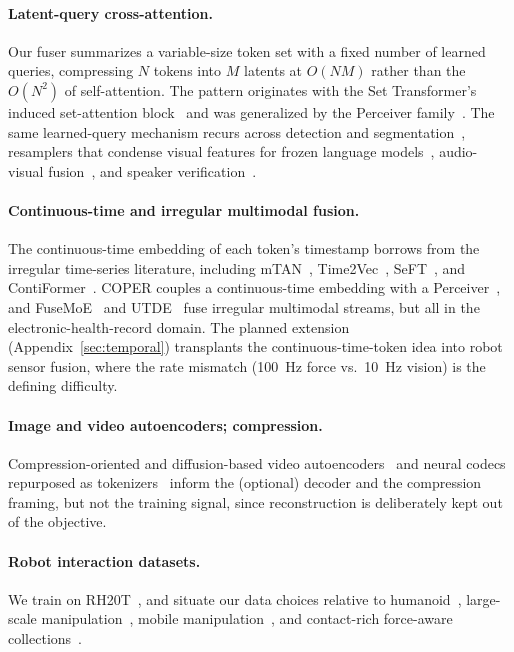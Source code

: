 \documentclass{article}
\begin{document}
\paragraph{Latent-query cross-attention.}
Our fuser summarizes a variable-size token set with a fixed number of learned queries, compressing $N$ tokens into $M$ latents at $O(NM)$ rather than the $O(N^2)$ of self-attention. The pattern originates with the Set Transformer's induced set-attention block~\citep{settransformer2019} and was generalized by the Perceiver family~\citep{perceiver2021,perceiverio2021,perceiverar2022}. The same learned-query mechanism recurs across detection and segmentation~\citep{detr2020,mask2former2022}, resamplers that condense visual features for frozen language models~\citep{flamingo2022,blip2_2023}, audio-visual fusion~\citep{mbt2021}, and speaker verification~\citep{acanet2023}.

\paragraph{Continuous-time and irregular multimodal fusion.}
The continuous-time embedding of each token's timestamp borrows from the irregular time-series literature, including mTAN~\citep{mtan2021}, Time2Vec~\citep{time2vec2019}, SeFT~\citep{seft2019}, and ContiFormer~\citep{contiformer2024}. COPER couples a continuous-time embedding with a Perceiver~\citep{coper2022}, and FuseMoE~\citep{fusemoe2024} and UTDE~\citep{utde2022} fuse irregular multimodal streams, but all in the electronic-health-record domain. The planned extension (Appendix~\ref{sec:temporal}) transplants the continuous-time-token idea into robot sensor fusion, where the rate mismatch (100~Hz force vs.\ 10~Hz vision) is the defining difficulty.

\paragraph{Image and video autoencoders; compression.}
Compression-oriented and diffusion-based video autoencoders~\citep{adaptive1dvdae2026,rvmae2026,videoae2601,videoae2604, multimodalcompression2022} and neural codecs repurposed as tokenizers~\citep{biosignaltokenizers2025} inform the (optional) decoder and the compression framing, but not the training signal, since reconstruction is deliberately kept out of the objective.

\paragraph{Robot interaction datasets.}
We train on RH20T~\citep{rh20t2023}, and situate our data choices relative to humanoid~\citep{humanoidseveryday2025}, large-scale manipulation~\citep{agibotworld2025}, mobile manipulation~\citep{airoamoma2025}, and contact-rich force-aware collections~\citep{forcevla22026}.
\end{document}

